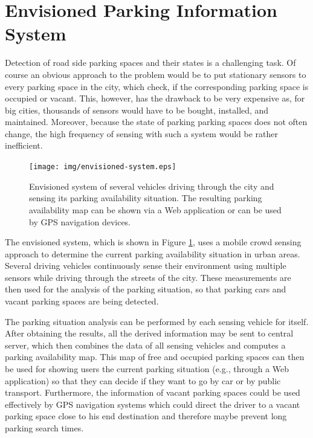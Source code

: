 \section{Envisioned Parking Information System}

Detection of road side parking spaces and their states is a challenging task. Of course an obvious approach to the problem would be to put stationary sensors to every parking space in the city, which check, if the corresponding parking space is occupied or vacant. This, however, has the drawback to be very expensive as, for big cities, thousands of sensors would have to be bought, installed, and maintained. Moreover, because the state of parking parking spaces does not often change, the high frequency of sensing with such a system would be rather inefficient.

\begin{figure}
	\centering
	\texttt{[image: img/envisioned-system.eps]}
	\caption{Envisioned system of several vehicles driving through the city and sensing its parking availability situation. The resulting parking availability map can be shown via a Web application or can be used by GPS navigation devices.}
	\label{fig:envisioned_system}
\end{figure}

The envisioned system, which is shown in Figure \ref{fig:envisioned_system}, uses a mobile crowd sensing approach to determine the current parking availability situation in urban areas. Several driving vehicles continuously sense their environment using multiple sensors while driving through the streets of the city. These measurements are then used for the analysis of the parking situation, so that parking cars and vacant parking spaces are being detected. 

The parking situation analysis can be performed by each sensing vehicle for itself. After obtaining the results, all the derived information may be sent to central server, which then combines the data of all sensing vehicles and computes a parking availability map. This map of free and occupied parking spaces can then be used for showing users the current parking situation (e.g., through a Web application) so that they can decide if they want to go by car or by public transport. Furthermore, the information of vacant parking spaces could be used effectively by GPS navigation systems which could direct the driver to a vacant parking space close to his end destination and therefore maybe prevent long parking search times.







